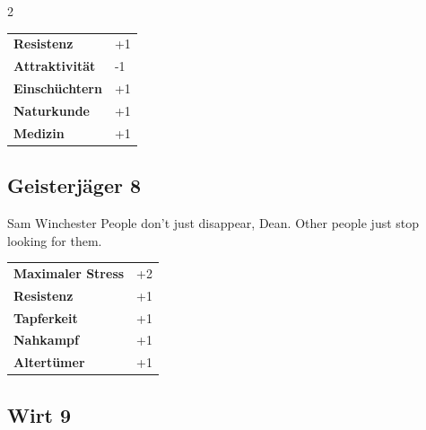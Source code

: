 \begin{multicols}{2}
\begin{tcolorbox}
\begin{tabular}{@{}ll@{}}
    \textbf{Resistenz} & +1\\
    \textbf{Attraktivität} & -1\\
    \textbf{Einschüchtern} & +1\\
    \textbf{Naturkunde} & +1\\
    \textbf{Medizin} & +1\\
\end{tabular}


\end{tcolorbox}

\begin{tcolorbox}
    \subsection*{Geisterjäger \hfill \small{8 }}
    \tcblower


\begin{pquote}{Sam Winchester}
People don’t just disappear, Dean. Other people just stop looking for them.
\end{pquote}

\vspace{3mm}

\begin{tabular}{@{}ll@{}}
    \textbf{Maximaler Stress} & +2\\
    \textbf{Resistenz} & +1\\
    \textbf{Tapferkeit} & +1\\
    \textbf{Nahkampf} & +1\\
    \textbf{Altertümer} & +1\\
\end{tabular}


\end{tcolorbox}

\begin{tcolorbox}
    \subsection*{Wirt \hfill \small{9 }}
    \tcblower





\end{tcolorbox}
\end{multicols}
